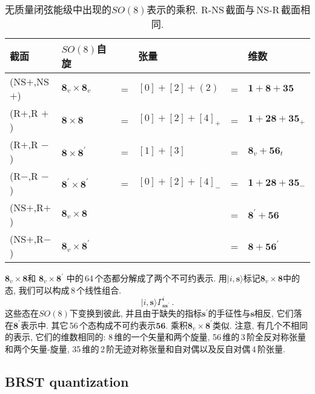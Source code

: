 \begin{table}[ht]
\caption{无质量闭弦能级中出现的$ SO(8) $表示的乘积. R-NS\,截面与\,NS-R\,截面相同.}
\label{tab:10.3}%
\centering
\begin{tabular}[c]{llclcl}
\hline\hline
 \vphantom{\Big(}截面  & $SO(8) $自旋  & & 张量 & & 维数 \\
\hline
 (NS$+$,NS$+$)& $\mathbf{8}_{v} \times \mathbf{8}_{v}$ & = & $[0]+[2]+(2)$ & = & $\mathbf{1}+\mathbf{8}+\mathbf{35} $\\
 (R$+$,R $+$) & $\mathbf{8} \times \mathbf{8}$ & = & $[0]+[2]+[4]_{+}$ & = & $\mathbf{1}+\mathbf{28}+\mathbf{35}_{+} $ \\
 (R$+$,R $-$)& $\mathbf{8}\times \mathbf{8}^{\prime}$ & = & $[1]+[3]$ & = & $\mathbf{8}_{v}+\mathbf{56}_{t} $ \\
 (R$-$,R $-$)& $\mathbf{8}^{\prime} \times \mathbf{8}^{\prime}$ & = & $[0]+[2]+[4]_{-}$ & = & $\mathbf{1}+\mathbf{28}+\mathbf{35}_{-} $ \\
 (NS$+$,R$+$)& $\mathbf{8}_{v} \times \mathbf{8}$ &  & & = & $ \mathbf{8}^{\prime}+\mathbf{56} $\\
 (NS$+$,R$-$)& $\mathbf{8}_{v} \times \mathbf{8}^{\prime}$ &  & & = & $ \mathbf{8}+\mathbf{56}^{\prime} $ \\
 \hline\hline
\end{tabular}
\end{table}

$\mathbf{8}_{v} \times \mathbf{8} $和 $\mathbf{8}_{v} \times \mathbf{8}^{\prime}$ 中的\,64\,个态都分解成了两个不可约表示. 用$ \lvert i,\mathbf{s}\rangle $标记$ \mathbf{8}_{v} \times \mathbf{8} $中的态, 我们可以构成\,8\,个线性组合.
\begin{equation}
    \lvert i,\mathbf{s}\rangle \Gamma_{\mathbf{s}\mathbf{s}^{\prime}}^{i} \: . \label{10.5.19}
\end{equation}
这些态在$ SO(8) $下变换到彼此, 并且由于缺失的指标$ \mathbf{s}^{\prime} $的手征性与$ \mathbf{s} $相反, 它们落在$ \mathbf{8}^{\prime} $表示中. 其它\,56\,个态构成不可约表示$ \mathbf{56}$. 乘积$ \mathbf{8}_{v} \times \mathbf{8}^{\prime} $类似. 注意, 有几个不相同的表示, 它们的维数相同的: 8\,维的一个矢量和两个旋量, 56\,维的\,3\,阶全反对称张量和两个矢量-旋量, 35\,维的\,2\,阶无迹对称张量和自对偶以及反自对偶\,4\,阶张量.


\subsection*{BRST quantization}


